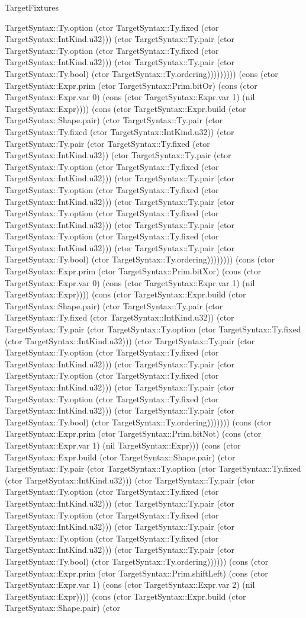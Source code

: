 \begin{lexlean}{TargetFixtures}
\begin{semanticmodule}
{TargetSyntax::Ty.option (ctor TargetSyntax::Ty.fixed (ctor TargetSyntax::IntKind.u32))) (ctor TargetSyntax::Ty.pair (ctor TargetSyntax::Ty.option (ctor TargetSyntax::Ty.fixed (ctor TargetSyntax::IntKind.u32))) (ctor TargetSyntax::Ty.pair (ctor TargetSyntax::Ty.bool) (ctor TargetSyntax::Ty.ordering))))))))) (cons (ctor TargetSyntax::Expr.prim (ctor TargetSyntax::Prim.bitOr) (cons (ctor TargetSyntax::Expr.var 0) (cons (ctor TargetSyntax::Expr.var 1) (nil TargetSyntax::Expr)))) (cons (ctor TargetSyntax::Expr.build (ctor TargetSyntax::Shape.pair) (ctor TargetSyntax::Ty.pair (ctor TargetSyntax::Ty.fixed (ctor TargetSyntax::IntKind.u32)) (ctor TargetSyntax::Ty.pair (ctor TargetSyntax::Ty.fixed (ctor TargetSyntax::IntKind.u32)) (ctor TargetSyntax::Ty.pair (ctor TargetSyntax::Ty.option (ctor TargetSyntax::Ty.fixed (ctor TargetSyntax::IntKind.u32))) (ctor TargetSyntax::Ty.pair (ctor TargetSyntax::Ty.option (ctor TargetSyntax::Ty.fixed (ctor TargetSyntax::IntKind.u32))) (ctor TargetSyntax::Ty.pair (ctor TargetSyntax::Ty.option (ctor TargetSyntax::Ty.fixed (ctor TargetSyntax::IntKind.u32))) (ctor TargetSyntax::Ty.pair (ctor TargetSyntax::Ty.option (ctor TargetSyntax::Ty.fixed (ctor TargetSyntax::IntKind.u32))) (ctor TargetSyntax::Ty.pair (ctor TargetSyntax::Ty.bool) (ctor TargetSyntax::Ty.ordering)))))))) (cons (ctor TargetSyntax::Expr.prim (ctor TargetSyntax::Prim.bitXor) (cons (ctor TargetSyntax::Expr.var 0) (cons (ctor TargetSyntax::Expr.var 1) (nil TargetSyntax::Expr)))) (cons (ctor TargetSyntax::Expr.build (ctor TargetSyntax::Shape.pair) (ctor TargetSyntax::Ty.pair (ctor TargetSyntax::Ty.fixed (ctor TargetSyntax::IntKind.u32)) (ctor TargetSyntax::Ty.pair (ctor TargetSyntax::Ty.option (ctor TargetSyntax::Ty.fixed (ctor TargetSyntax::IntKind.u32))) (ctor TargetSyntax::Ty.pair (ctor TargetSyntax::Ty.option (ctor TargetSyntax::Ty.fixed (ctor TargetSyntax::IntKind.u32))) (ctor TargetSyntax::Ty.pair (ctor TargetSyntax::Ty.option (ctor TargetSyntax::Ty.fixed (ctor TargetSyntax::IntKind.u32))) (ctor TargetSyntax::Ty.pair (ctor TargetSyntax::Ty.option (ctor TargetSyntax::Ty.fixed (ctor TargetSyntax::IntKind.u32))) (ctor TargetSyntax::Ty.pair (ctor TargetSyntax::Ty.bool) (ctor TargetSyntax::Ty.ordering))))))) (cons (ctor TargetSyntax::Expr.prim (ctor TargetSyntax::Prim.bitNot) (cons (ctor TargetSyntax::Expr.var 1) (nil TargetSyntax::Expr))) (cons (ctor TargetSyntax::Expr.build (ctor TargetSyntax::Shape.pair) (ctor TargetSyntax::Ty.pair (ctor TargetSyntax::Ty.option (ctor TargetSyntax::Ty.fixed (ctor TargetSyntax::IntKind.u32))) (ctor TargetSyntax::Ty.pair (ctor TargetSyntax::Ty.option (ctor TargetSyntax::Ty.fixed (ctor TargetSyntax::IntKind.u32))) (ctor TargetSyntax::Ty.pair (ctor TargetSyntax::Ty.option (ctor TargetSyntax::Ty.fixed (ctor TargetSyntax::IntKind.u32))) (ctor TargetSyntax::Ty.pair (ctor TargetSyntax::Ty.option (ctor TargetSyntax::Ty.fixed (ctor TargetSyntax::IntKind.u32))) (ctor TargetSyntax::Ty.pair (ctor TargetSyntax::Ty.bool) (ctor TargetSyntax::Ty.ordering)))))) (cons (ctor TargetSyntax::Expr.prim (ctor TargetSyntax::Prim.shiftLeft) (cons (ctor TargetSyntax::Expr.var 1) (cons (ctor TargetSyntax::Expr.var 2) (nil TargetSyntax::Expr)))) (cons (ctor TargetSyntax::Expr.build (ctor TargetSyntax::Shape.pair) (ctor }
\end{semanticmodule}
\end{lexlean}
